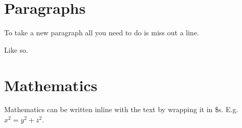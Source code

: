 \section{Paragraphs}

To take a new paragraph all you need to do is miss out a line.

Like so.

\section{Mathematics}

Mathematics can be written inline with the text by wrapping it in \$s. E.g. $x^2 = y^2 + z^2$.